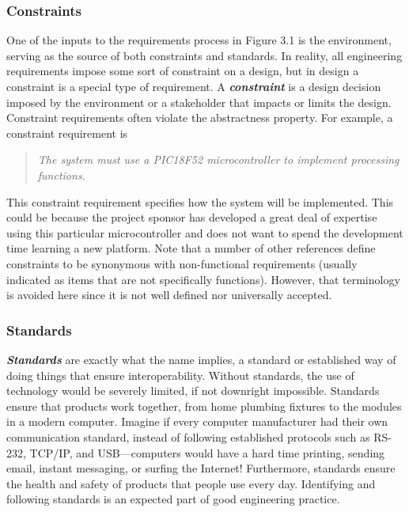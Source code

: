 \subsubsection{Constraints}\label{constraints}

One of the inputs to the requirements process in Figure 3.1 is the
environment, serving as the source of both constraints and standards. In
reality, all engineering requirements impose some sort of constraint on
a design, but in design a constraint is a special type of requirement. A
\emph{\textbf{constraint}} is a design decision imposed by the
environment or a stakeholder that impacts or limits the design.
Constraint requirements often violate the abstractness property. For
example, a constraint requirement is

\begin{quote}
\emph{The system must use a PIC18F52 microcontroller to implement
processing functions.}
\end{quote}

This constraint requirement specifies how the system will be
implemented. This could be because the project sponsor has developed a
great deal of expertise using this particular microcontroller and does
not want to spend the development time learning a new platform. Note
that a number of other references define constraints to be synonymous
with non-functional requirements (usually indicated as items that are
not specifically functions). However, that terminology is avoided here
since it is not well defined nor universally accepted.

\subsubsection{Standards}\label{standards}

\emph{\textbf{Standards}} are exactly what the name implies, a standard
or established way of doing things that ensure interoperability. Without
standards, the use of technology would be severely limited, if not
downright impossible. Standards ensure that products work together, from
home plumbing fixtures to the modules in a modern computer. Imagine if
every computer manufacturer had their own communication standard,
instead of following established protocols such as RS-232, TCP/IP, and
USB---computers would have a hard time printing, sending email, instant
messaging, or surfing the Internet! Furthermore, standards ensure the
health and safety of products that people use every day. Identifying and
following standards is an expected part of good engineering practice.

